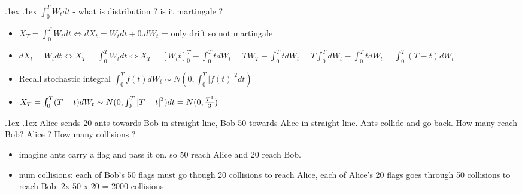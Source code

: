 \documentclass[10pt,landscape,a4paper]{article}
\makeatletter
\renewcommand{\section}{\@startsection{section}{1}{0mm}%
                                {.1ex}%
                                {.1ex}%
                                {\color{blue}\sffamily\small\bfseries}}
\makeatother
\begin{document}
\begin{multicols*}{4}
\begin{spacing}{0.1}
\section{$\int_0^T W_t dt$ - what is distribution ? is it martingale ?}
\begin{itemize}
\item $X_T=\int_0^T W_t dt \Leftrightarrow dX_t=W_tdt+0.dW_t$ =  only drift so not martingale
\item $dX_t=W_tdt \Leftrightarrow X_T=\int_0^T W_t dt \Leftrightarrow X_T = [W_tt]_0^T - \int_{0}^{T}tdW_t = TW_T- \int_{0}^{T}tdW_t = T\int_{0}^{T}dW_t - \int_{0}^{T}tdW_t  = \int_{0}^{T} (T-t) dW_t$
\item Recall stochastic integral \colorbox{green!10}{ $\int_0^T f(t)dW_t \sim N(0,\int_{0}^{T}{|f(t)|}^2 dt)$}
\item $X_T=\int_{0}^{T} (T-t) dW_t \sim N(0,\int_0^T {|T-t|}^2)dt=N(0,{T^3 \over 3})$
\end{itemize}
\section{Alice sends 20 ants towards Bob in straight line, Bob 50 towards Alice in straight line. Ants collide and go back. How many reach Bob? Alice ? How many collisions ?}
\begin{itemize}
\item imagine ants carry a flag and pass it on. so 50 reach Alice and 20 reach Bob.
\item num collisions: each of Bob's 50 flags must go though 20 collisions to reach Alice, each of Alice's 20 flags goes through 50 collisions to reach Bob: 2x 50 x 20 = 2000 collisions
\end{itemize}


\end{spacing}
\end{multicols*}
\end{document}
